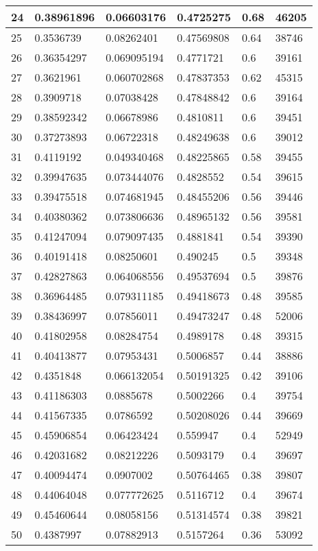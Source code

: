 \begin{longtable}{|l|l|l|l|l|l|}
24 & 0.38961896 & 0.06603176 & 0.4725275 & 0.68 & 46205 \\ \hline 
25 & 0.3536739 & 0.08262401 & 0.47569808 & 0.64 & 38746 \\ \hline 
26 & 0.36354297 & 0.069095194 & 0.4771721 & 0.6 & 39161 \\ \hline 
27 & 0.3621961 & 0.060702868 & 0.47837353 & 0.62 & 45315 \\ \hline 
28 & 0.3909718 & 0.07038428 & 0.47848842 & 0.6 & 39164 \\ \hline 
29 & 0.38592342 & 0.06678986 & 0.4810811 & 0.6 & 39451 \\ \hline 
30 & 0.37273893 & 0.06722318 & 0.48249638 & 0.6 & 39012 \\ \hline 
31 & 0.4119192 & 0.049340468 & 0.48225865 & 0.58 & 39455 \\ \hline 
32 & 0.39947635 & 0.073444076 & 0.4828552 & 0.54 & 39615 \\ \hline 
33 & 0.39475518 & 0.074681945 & 0.48455206 & 0.56 & 39446 \\ \hline 
34 & 0.40380362 & 0.073806636 & 0.48965132 & 0.56 & 39581 \\ \hline 
35 & 0.41247094 & 0.079097435 & 0.4881841 & 0.54 & 39390 \\ \hline 
36 & 0.40191418 & 0.08250601 & 0.490245 & 0.5 & 39348 \\ \hline 
37 & 0.42827863 & 0.064068556 & 0.49537694 & 0.5 & 39876 \\ \hline 
38 & 0.36964485 & 0.079311185 & 0.49418673 & 0.48 & 39585 \\ \hline 
39 & 0.38436997 & 0.07856011 & 0.49473247 & 0.48 & 52006 \\ \hline 
40 & 0.41802958 & 0.08284754 & 0.4989178 & 0.48 & 39315 \\ \hline 
41 & 0.40413877 & 0.07953431 & 0.5006857 & 0.44 & 38886 \\ \hline 
42 & 0.4351848 & 0.066132054 & 0.50191325 & 0.42 & 39106 \\ \hline 
43 & 0.41186303 & 0.0885678 & 0.5002266 & 0.4 & 39754 \\ \hline 
44 & 0.41567335 & 0.0786592 & 0.50208026 & 0.44 & 39669 \\ \hline 
45 & 0.45906854 & 0.06423424 & 0.559947 & 0.4 & 52949 \\ \hline 
46 & 0.42031682 & 0.08212226 & 0.5093179 & 0.4 & 39697 \\ \hline 
47 & 0.40094474 & 0.0907002 & 0.50764465 & 0.38 & 39807 \\ \hline 
48 & 0.44064048 & 0.077772625 & 0.5116712 & 0.4 & 39674 \\ \hline 
49 & 0.45460644 & 0.08058156 & 0.51314574 & 0.38 & 39821 \\ \hline 
50 & 0.4387997 & 0.07882913 & 0.5157264 & 0.36 & 53092 \\ \hline 
\end{longtable}